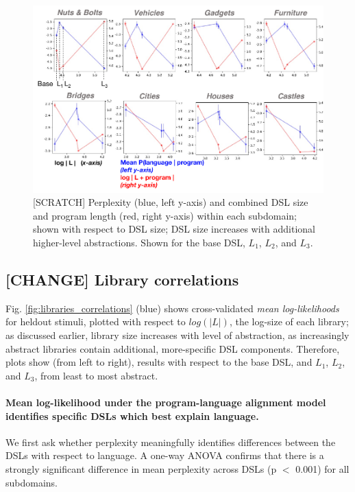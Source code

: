 \documentclass[10pt,letterpaper]{article}
\begin{document}
\begin{figure}[b!]
  \begin{center}
  \includegraphics[width=\linewidth]{figures/fig_perplexity_costs_narrow.pdf}
  \caption{[SCRATCH] Perplexity (blue, left y-axis) and combined DSL size and program length (red, right y-axis) within each subdomain; shown with respect to DSL size; DSL size increases with additional higher-level abstractions. Shown for the base DSL, $L_1$, $L_2$, and $L_3$.}\label{fig:perplexity-length}
  \end{center}
\end{figure} 

\subsection{[CHANGE] Library correlations}

Fig. \ref{fig:libraries_correlations} (blue) shows cross-validated \textit{mean log-likelihoods} for heldout stimuli, plotted with respect to $log(|L|)$, the log-size of each library; as discussed earlier, library size increases with level of abstraction, as increasingly abstract libraries contain additional, more-specific DSL components. Therefore, plots show (from left to right), results with respect to the base DSL, and $L_1$, $L_2$, and $L_3$, from least to most abstract. 

\paragraph{Mean log-likelihood under the program-language alignment model identifies specific DSLs which best explain language.} We first ask whether perplexity meaningfully identifies differences between the DSLs with respect to language. A one-way ANOVA confirms that there is a strongly significant difference in mean perplexity across DSLs (p $<$ 0.001) for all subdomains. 
\end{document}
